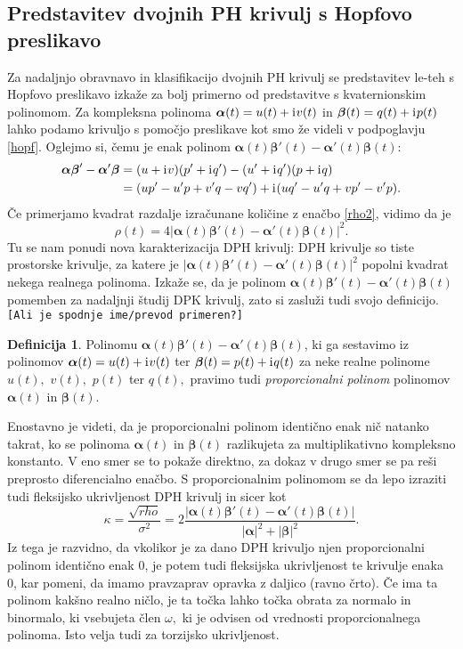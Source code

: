 \documentclass[12pt,a4paper,twoside]{article}
\newcommand{\iu}{\mathrm{i}\mkern1mu} %
\theoremstyle{definition} %
\newtheorem{definicija}{Definicija}[section]
\theoremstyle{plain} %
\numberwithin{equation}{section}  %
\newcommand{\balpha}{\boldsymbol \alpha}
\newcommand{\bbeta}{\boldsymbol \beta}
\begin{document}
\subsection{Predstavitev dvojnih PH krivulj s Hopfovo preslikavo}

Za nadaljnjo obravnavo in klasifikacijo dvojnih PH krivulj se predstavitev le-teh s Hopfovo preslikavo izkaže za bolj primerno od predstavitve s kvaternionskim polinomom. Za kompleksna polinoma $\balpha(t)=u(t)+\iu v(t)$ in $\bbeta(t)=q(t)+\iu p(t)$ lahko podamo krivuljo s pomočjo preslikave kot smo že videli v podpoglavju \ref{hopf}. Oglejmo si, čemu je enak polinom $\balpha(t)\bbeta'(t)-\balpha'(t)\bbeta(t):$
\begin{align}
	\balpha\bbeta'-\balpha'\bbeta&=(u+\iu v)(p'+\iu q')-(u'+\iu q')(p+\iu q) \nonumber \\
	&=(up'-u'p+v'q-vq')+\iu(uq'-u'q+vp'-v'p).
\end{align}
Če primerjamo kvadrat razdalje izračunane količine z enačbo \eqref{rho2}, vidimo da je
\begin{equation}
	\label{rho_propoly}
	\rho(t)=4|\balpha(t)\bbeta'(t)-\balpha'(t)\bbeta(t)|^2.
\end{equation}
Tu se nam ponudi nova karakterizacija DPH krivulj: DPH krivulje so tiste prostorske krivulje, za katere je $|\balpha(t)\bbeta'(t)-\balpha'(t)\bbeta(t)|^2$ popolni kvadrat nekega realnega polinoma. Izkaže se, da je polinom $\balpha(t)\bbeta'(t)-\balpha'(t)\bbeta(t)$ pomemben za nadaljnji študij DPK krivulj, zato si zasluži tudi svojo definicijo.\texttt{[Ali je spodnje ime/prevod primeren?]}
\begin{definicija}
	Polinomu $\balpha(t)\bbeta'(t)-\balpha'(t)\bbeta(t)$, ki ga sestavimo iz polinomov $\balpha(t)=u(t)+\iu v(t)$ ter $\bbeta(t)=p(t)+\iu q(t)$ za neke realne polinome $u(t),$ $v(t),$ $p(t)$ ter $q(t),$ pravimo tudi \emph{proporcionalni polinom} polinomov $\balpha(t)$ in $\bbeta(t).$
\end{definicija}
Enostavno je videti, da je proporcionalni polinom identično enak nič natanko takrat, ko se polinoma $\balpha(t)$ in $\bbeta(t)$ razlikujeta za multiplikativno kompleksno konstanto. V eno smer se to pokaže direktno, za dokaz v drugo smer se pa reši preprosto diferencialno enačbo.
S proporcionalnim polinomom se da lepo izraziti tudi fleksijsko ukrivljenost DPH krivulj in sicer kot
\begin{equation}
	\kappa=\frac{\sqrt{rho}}{\sigma^2}=2\frac{|\balpha(t)\bbeta'(t)-\balpha'(t)\bbeta(t)|}{|\balpha|^2+|\bbeta|^2}.
\end{equation}
Iz tega je razvidno, da vkolikor je za dano DPH krivuljo njen proporcionalni polinom identično enak 0, je potem tudi fleksijska ukrivljenost te krivulje enaka 0, kar pomeni, da imamo pravzaprav opravka z daljico (ravno črto). Če ima ta polinom kakšno realno ničlo, je ta točka lahko točka obrata za normalo in binormalo, ki vsebujeta člen $\omega,$ ki je odvisen od vrednosti proporcionalnega polinoma. Isto velja tudi za torzijsko ukrivljenost.
\end{document}
